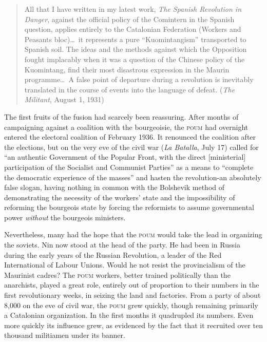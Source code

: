 \begin{quotation}
  All that I have written in my latest work, \emph{The Spanish Revolution in Danger}, against the official policy of the Comintern in the Spanish question, applies entirely to the Catalonian Federation (Workers and Peasants bloc)\ldots\ it represents a pure ``Kuomintangism'' transported to Spanish soil. The ideas and the methods against which the Opposition fought implacably when it was a question of the Chinese policy of the Kuomintang, find their most disastrous expression in the Maurin programme\ldots\ A false point of departure during a revolution is inevitably translated in the course of events into the language of defeat. (\emph{The Militant}, August 1, 1931)
\end{quotation}

The first fruits of the fusion had scarcely been reassuring. After months of campaigning against a coalition with the bourgeoisie, the \textsc{poum} had overnight entered the electoral coalition of February 1936. It renounced the coalition after the elections, but on the very eve of the civil war (\emph{La Batalla}, July 17) called for ``an authentic Government of the Popular Front, with the direct [ministerial] participation of the Socialist and Communist Parties'' as a means to ``complete the democratic experience of the masses'' and hasten the revolution-an absolutely false slogan, having nothing in common with the Bolshevik method of demonstrating the necessity of the workers’ state and the impossibility of reforming the bourgeois state by forcing the reformists to assume governmental power \emph{without} the bourgeois ministers.

Nevertheless, many had the hope that the \textsc{poum} would take the lead in organizing the soviets. Nin now stood at the head of the party. He had been in Russia during the early years of the Russian Revolution, a leader of the {Red International of Labour Unions}. Would he not resist the provincialism of the Maurinist cadres? The \textsc{poum} workers, better trained politically than the anarchists, played a great role, entirely out of proportion to their numbers in the first revolutionary weeks, in seizing the land and factories. From a party of about 8,000 on the eve of civil war, the \textsc{poum} grew quickly, though remaining primarily a Catalonian organization. In the first months it quadrupled its numbers. Even more quickly its influence grew, as evidenced by the fact that it recruited over ten thousand militiamen under its banner.

